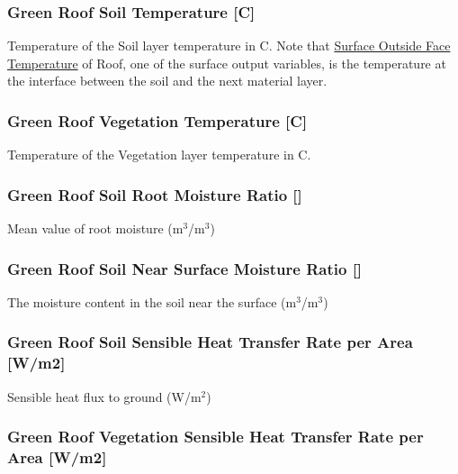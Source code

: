 \subsubsection{Green Roof Soil Temperature {[}C{]}}\label{green-roof-soil-temperature-c}

Temperature of the Soil layer temperature in C. Note that \hyperref[surface-outside-face-temperature-c]{Surface Outside Face Temperature} of Roof, one of the surface output variables, is the temperature at the interface between the soil and the next material layer.


\subsubsection{Green Roof Vegetation Temperature {[}C{]}}\label{green-roof-vegetation-temperature-c}

Temperature of the Vegetation layer temperature in C.

\subsubsection{Green Roof Soil Root Moisture Ratio {[]}}\label{green-roof-soil-root-moisture-ratio}

Mean value of root moisture (m\(^{3}\)/m\(^{3}\))

\subsubsection{Green Roof Soil Near Surface Moisture Ratio {[]}}\label{green-roof-soil-near-surface-moisture-ratio}

The moisture content in the soil near the surface (m\(^{3}\)/m\(^{3}\))

\subsubsection{Green Roof Soil Sensible Heat Transfer Rate per Area {[}W/m2{]}}\label{green-roof-soil-sensible-heat-transfer-rate-per-area-wm2}

Sensible heat flux to ground (W/m\(^{2}\))

\subsubsection{Green Roof Vegetation Sensible Heat Transfer Rate per Area {[}W/m2{]}}\label{green-roof-vegetation-sensible-heat-transfer-rate-per-area-wm2}

